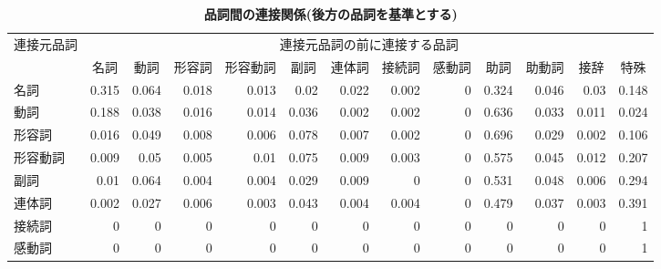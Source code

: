 \begin{table}
\begin{center}
 \caption{\bf 品詞間の連接関係(後方の品詞を基準とする)}
 \label{tab:connect_matrix}
 \tiny
\def\arraystretch{}
 \begin{tabular}{l|r|r|r|r|r|r|r|r|r|r|r|r} \hline \hline
 {連接元品詞} & \multicolumn{12}{c}{連接元品詞の前に連接する品詞} 
                                                       \\ \cline{2-13}
             & \multicolumn{1}{c|}{名詞}
             & \multicolumn{1}{c|}{動詞}
             & \multicolumn{1}{c|}{形容詞}
             & \multicolumn{1}{c|}{形容動詞}
             & \multicolumn{1}{c|}{副詞}
             & \multicolumn{1}{c|}{連体詞}
             & \multicolumn{1}{c|}{接続詞}
             & \multicolumn{1}{c|}{感動詞}
             & \multicolumn{1}{c|}{助詞}
             & \multicolumn{1}{c|}{助動詞}
             & \multicolumn{1}{c|}{接辞}
             & \multicolumn{1}{c}{特殊} \\ \hline 
   名詞      & 0.315 &  0.064 &  0.018 &  0.013 &  0.02
             &  0.022 &  0.002 &     0  & 0.324
             &  0.046 &  0.03  & 0.148  \\
   \hline
   動詞      & 0.188 &  0.038 &  0.016 &  0.014 &  0.036 
             &  0.002 &  0.002 &      0 & 0.636     
             &  0.033 &  0.011 &  0.024  \\
   \hline
   形容詞    &  0.016 &  0.049 &  0.008 &  0.006 &  0.078 
             &  0.007 &  0.002 &      0 & 0.696
             &  0.029 &  0.002 & 0.106  \\
   \hline
   形容動詞  &  0.009 &  0.05 &  0.005 &  0.01 &  0.075 
             &  0.009 &  0.003 &     0  & 0.575 
             &  0.045 &  0.012 & 0.207  \\
   \hline
   副詞      & 0.01  &  0.064 &  0.004 &  0.004 &  0.029 
             & 0.009  &     0  &      0 & 0.531
             &  0.048 &  0.006 & 0.294  \\
   \hline
   連体詞    & 0.002  &  0.027 &  0.006 &  0.003 &  0.043
             & 0.004  &  0.004 &     0  & 0.479
             &  0.037 &  0.003 & 0.391  \\
   \hline
   接続詞    &      0 &      0 &      0 &      0 &     0
             &      0 &      0 &      0 &      0 
             &      0 &      0 & 1 \\
   \hline
   感動詞    &      0 &      0 &      0 &      0 &     0
             &      0 &      0 &      0 &      0
             &      0 &      0 & 1 \\

\end{tabular}
\end{center}
\end{table}
